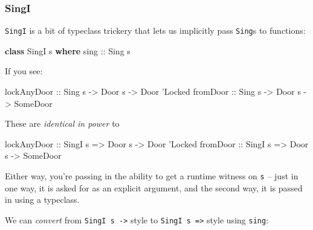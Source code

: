 \documentclass[]{article}
\newenvironment{Shaded}{}{}
\newcommand{\DataTypeTok}[1]{\textcolor[rgb]{0.56,0.13,0.00}{#1}}
\newcommand{\KeywordTok}[1]{\textcolor[rgb]{0.00,0.44,0.13}{\textbf{#1}}}
\newcommand{\NormalTok}[1]{#1}
\newcommand{\OtherTok}[1]{\textcolor[rgb]{0.00,0.44,0.13}{#1}}
\begin{document}
\hypertarget{singi}{%
\subsubsection{SingI}\label{singi}}

\texttt{SingI} is a bit of typeclass trickery that lets us implicitly pass
\texttt{Sing}s to functions:

\begin{Shaded}
\begin{Highlighting}[]
\KeywordTok{class} \DataTypeTok{SingI}\NormalTok{ s }\KeywordTok{where}
\OtherTok{    sing ::} \DataTypeTok{Sing}\NormalTok{ s}
\end{Highlighting}
\end{Shaded}

If you see:

\begin{Shaded}
\begin{Highlighting}[]
\OtherTok{lockAnyDoor ::} \DataTypeTok{Sing}\NormalTok{  s }\OtherTok{->} \DataTypeTok{Door}\NormalTok{ s }\OtherTok{->} \DataTypeTok{Door}\NormalTok{ '}\DataTypeTok{Locked}
\OtherTok{fromDoor    ::} \DataTypeTok{Sing}\NormalTok{  s }\OtherTok{->} \DataTypeTok{Door}\NormalTok{ s }\OtherTok{->} \DataTypeTok{SomeDoor}
\end{Highlighting}
\end{Shaded}

These are \emph{identical in power} to

\begin{Shaded}
\begin{Highlighting}[]
\OtherTok{lockAnyDoor ::} \DataTypeTok{SingI}\NormalTok{ s }\OtherTok{=>} \DataTypeTok{Door}\NormalTok{ s }\OtherTok{->} \DataTypeTok{Door}\NormalTok{ '}\DataTypeTok{Locked}
\OtherTok{fromDoor    ::} \DataTypeTok{SingI}\NormalTok{ s }\OtherTok{=>} \DataTypeTok{Door}\NormalTok{ s }\OtherTok{->} \DataTypeTok{SomeDoor}
\end{Highlighting}
\end{Shaded}

Either way, you're passing in the ability to get a runtime witness on \texttt{s}
-- just in one way, it is asked for as an explicit argument, and the second way,
it is passed in using a typeclass.

We can \emph{convert} from \texttt{SingI\ s\ -\textgreater{}} style to
\texttt{SingI\ s\ =\textgreater{}} style using \texttt{sing}:
\end{document}

